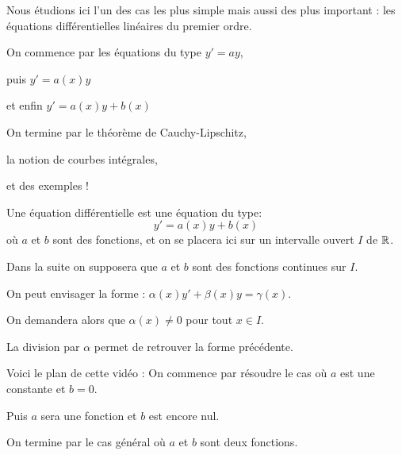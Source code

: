 







\debuttexte


\diapo

Nous étudions ici l'un des cas les plus simple mais aussi des plus important :
les équations différentielles linéaires du premier ordre.


\change

\change
On commence par les équations du type  $y'=ay$,

\change
puis $y'=a(x)y$

\change
et enfin $y' = a(x)y+b(x)$

\change
On termine par le théorème de Cauchy-Lipschitz,

\change
la notion de courbes intégrales,

\change
et des exemples !

\diapo


Une équation différentielle  est une équation du type: 
\begin{equation}
  y'=a(x)y + b(x)   
  \label{eq:eqdifflinordre1}
  \tag{$E$}
\end{equation}
où $a$ et $b$ sont des fonctions, et on se placera ici 
sur un intervalle ouvert $I$ de $\mathbb{R}$. 

\change
Dans la suite on supposera que $a$ et $b$ sont 
des fonctions continues sur $I$.

\change
On peut envisager la forme : 
$\alpha (x)y'+\beta (x)y=\gamma (x)$.

\change
On demandera alors que $\alpha (x)\neq 0$ pour tout $x\in I$. 

\change
La division par $\alpha $ permet de retrouver la forme précédente.
 

 \change
Voici le plan de cette vidéo :
On commence par résoudre le cas où $a$ est une constante et $b=0$.

\change
Puis $a$ sera une fonction et $b$ est encore nul.

\change
On termine par le cas général où $a$ et $b$ sont deux fonctions.

\diapo


